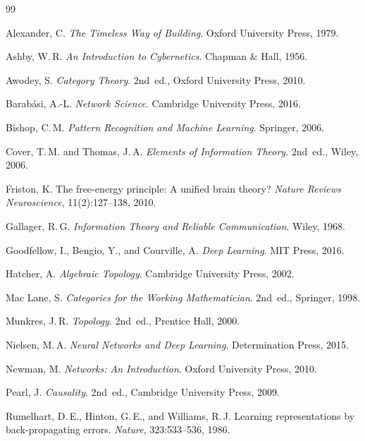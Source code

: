 \documentclass[12pt,oneside]{article}
\theoremstyle{plain}
\theoremstyle{definition}
\theoremstyle{remark}
\theoremstyle{plain}
\begin{document}
\begin{thebibliography}{99}

Alexander, C.
\newblock \emph{The Timeless Way of Building}.
\newblock Oxford University Press, 1979.

Ashby, W.\,R.
\newblock \emph{An Introduction to Cybernetics}.
\newblock Chapman \& Hall, 1956.

Awodey, S.
\newblock \emph{Category Theory}.
\newblock 2nd~ed., Oxford University Press, 2010.

Barab\'{a}si, A.-L.
\newblock \emph{Network Science}.
\newblock Cambridge University Press, 2016.

Bishop, C.\,M.
\newblock \emph{Pattern Recognition and Machine Learning}.
\newblock Springer, 2006.

Cover, T.\,M. and Thomas, J.\,A.
\newblock \emph{Elements of Information Theory}.
\newblock 2nd~ed., Wiley, 2006.

Friston, K.
\newblock The free-energy principle: A unified brain theory?
\newblock \emph{Nature Reviews Neuroscience}, 11(2):127--138, 2010.

Gallager, R.\,G.
\newblock \emph{Information Theory and Reliable Communication}.
\newblock Wiley, 1968.

Goodfellow, I., Bengio, Y., and Courville, A.
\newblock \emph{Deep Learning}.
\newblock MIT Press, 2016.

Hatcher, A.
\newblock \emph{Algebraic Topology}.
\newblock Cambridge University Press, 2002.

Mac Lane, S.
\newblock \emph{Categories for the Working Mathematician}.
\newblock 2nd~ed., Springer, 1998.

Munkres, J.\,R.
\newblock \emph{Topology}.
\newblock 2nd~ed., Prentice Hall, 2000.

Nielsen, M.\,A.
\newblock \emph{Neural Networks and Deep Learning}.
\newblock Determination Press, 2015.

Newman, M.
\newblock \emph{Networks: An Introduction}.
\newblock Oxford University Press, 2010.

Pearl, J.
\newblock \emph{Causality}.
\newblock 2nd~ed., Cambridge University Press, 2009.

Rumelhart, D.\,E., Hinton, G.\,E., and Williams, R.\,J.
\newblock Learning representations by back-propagating errors.
\newblock \emph{Nature}, 323:533--536, 1986.


\end{thebibliography}
\end{document}
